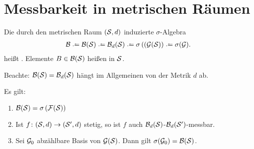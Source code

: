 
\section{Messbarkeit in metrischen Räumen}
\label{sec: 3.1}

\begin{definition}\label{definition: 3.1}
	Die durch den metrischen Raum $(\S,d)$ induzierte $\sigma$-Algebra
	\begin{align*}
		\B \defeq \B(\S) \defeq \B_d(\S) \defeq \sigma \brackets{(\G(\S)} \defeq \sigma(\G).
	\end{align*}
	heißt .
	Elemente $B  \in  \B(\S)$ heißen  in $\S$.
\end{definition}

Beachte: $\B(\S) = \B_d(\S)$ hängt im Allgemeinen von der Metrik $d$ ab.

\begin{lemma}\label{lemma: 3.2}
	Es gilt:
	\begin{enumerate}[label=(\arabic*)]
		\item \label{it: 3.2-OpenClosed} 
		$\B(\S) = \sigma\brackets{\mathcal{F}(\S)}$
		\item \label{it: 3.2-StetigMessbar} Ist $f \colon (\S,d) \to (\S',d)$ stetig, so ist $f$ auch $\B_d(\S)$-$\B_d(\S')$-messbar.
		\item \label{it: 3.2-BasisSigmaErzeuger}
			Sei $\G_0$ abzählbare Basis von $\G(\S)$. Dann gilt $\sigma(\G_0) = \B(\S)$.
	\end{enumerate}
\end{lemma}

